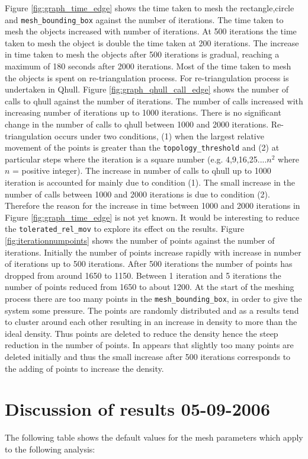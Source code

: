 \documentclass[10pt,a4paper]{book}
\begin{document}
Figure \ref{fig:graph_time_edge} shows the time taken to mesh the rectangle,circle and \texttt{mesh\_bounding\_box} against the number of iterations. The time taken to mesh the objects increased with number of iterations. At 500 iterations the time taken to mesh the object is double the time taken at 200 iterations. The increase in time taken to mesh the objects after 500 iterations is gradual, reaching a maximum of 180 seconds after 2000 iterations. Most of the time taken to mesh the objects is spent on re-triangulation process. For re-triangulation process is undertaken in Qhull. Figure \ref{fig:graph_qhull_call_edge} shows the number of calls to qhull against the number of iterations. The number of calls increased with increasing number of iterations up to 1000 iterations. There is no significant change in the number of calls to qhull between 1000 and 2000 iterations. Re-triangulation occurs under two conditions, (1) when the largest relative movement of the points is greater than the \texttt{topology\_threshold} and (2) at particular steps where the iteration is a square number (e.g. 4,9,16,25....$n^2$ where $n$ = positive integer). The increase in number of calls to qhull up to 1000 iteration is accounted for mainly due to condition (1). The small increase in the number of calls between 1000 and 2000 iterations is due to condition (2). Therefore the reason for the increase in time between 1000 and 2000 iterations in Figure \ref{fig:graph_time_edge} is not yet known. It would be interesting to reduce the \texttt{tolerated\_rel\_mov} to explore its effect on the results. Figure \ref{fig:iterationnumpoints} shows the number of points against the number of iterations. Initially the number of points increase rapidly with increase in number of iterations up to 500 iterations. After 500 iterations the number of points has dropped from around 1650 to 1150. Between 1 iteration and 5 iterations the number of points reduced from 1650 to about 1200. At the start of the meshing process there are too many points in the \texttt{mesh\_bounding\_box}, in order to give the system some pressure. The points are randomly distributed and as a results tend to cluster around each other resulting in an increase in density to more than the ideal density. Thus points are deleted to reduce the density hence the steep reduction in the number of points. In appears that slightly too many points are deleted initially and thus the small increase after 500 iterations corresponds to the adding of points to increase the density.

\newpage
\section{Discussion of results 05-09-2006}
\label{sec:resutls05092006}
The following table shows the default values for the mesh parameters which apply to the following analysis:
\end{document}
